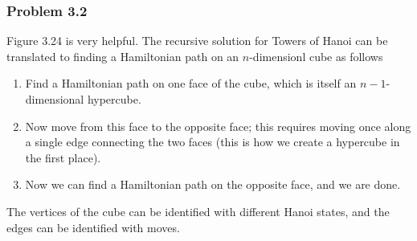 \subsubsection{Problem 3.2}
Figure 3.24 is very helpful. The recursive solution for Towers of Hanoi can be translated to finding a
Hamiltonian path on an $n$-dimensionl cube as follows
\begin{enumerate}
        \item Find a Hamiltonian path on one face of the cube, which is itself an $n-1$-dimensional hypercube.
        \item Now move from this face to the opposite face; this requires moving once along a single edge
                connecting the two faces (this is how we create a hypercube in the first place).
        \item Now we can find a Hamiltonian path on the opposite face, and we are done.
\end{enumerate}
The vertices of the cube can be identified with different Hanoi states, and the edges can be identified with
moves.
